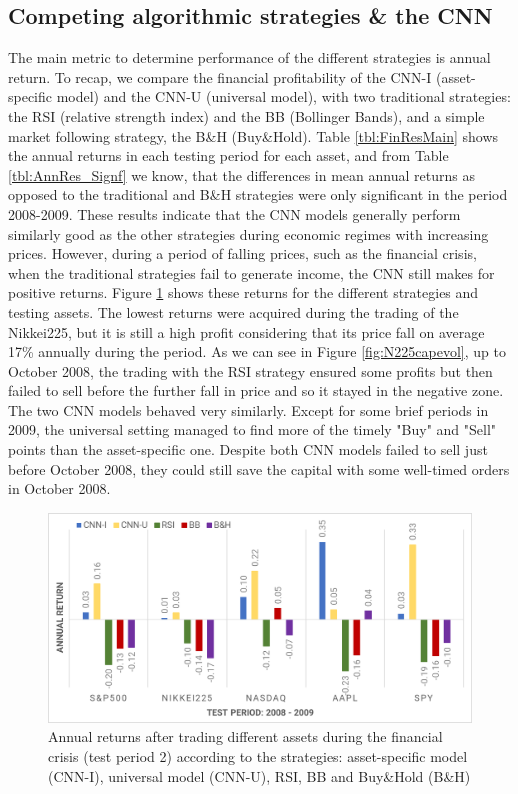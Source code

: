 \documentclass[11pt, a4paper]{article}
\begin{document}
\subsection{Competing algorithmic strategies \& the CNN}

The main metric to determine performance of the different strategies is annual return. 
To recap, we compare the financial profitability of the CNN-I (asset-specific model) and the CNN-U (universal model), with two traditional strategies: the RSI (relative strength index) and the BB (Bollinger Bands), and a simple market following strategy, the B\&H (Buy\&Hold). 
Table \ref{tbl:FinResMain} shows the annual returns in each testing period for each asset, and from Table \ref{tbl:AnnRes_Signf} we know, that the differences in mean annual returns as opposed to the traditional and B\&H strategies were only significant in the period 2008-2009. 
These results indicate that the CNN models generally perform similarly good as the other strategies during economic regimes with increasing prices. However, during a period of falling prices, such as the financial crisis, when the traditional strategies fail to generate income, the CNN still makes for positive returns. 
Figure \ref{fig:CNNvsComp_2} shows these returns for the different strategies and testing assets. The lowest returns were acquired during the trading of the Nikkei225, but it is still a high profit considering that its price fall on average 17\% annually during the period. As we can see in Figure \ref{fig:N225capevol}, up to October 2008, the trading with the RSI strategy ensured some profits but then failed to sell before the further fall in price and so it stayed in the negative zone. The two CNN models behaved very similarly. 
Except for some brief periods in 2009, the universal setting managed to find more of the timely "Buy" and "Sell" points than the asset-specific one. Despite both CNN models failed to sell just before October 2008, they could still save the capital with some well-timed orders in October 2008.
\begin{figure}[ht]
    \centering
    \includegraphics[width=.75\textwidth]{images/CNNvsComp_Crisis.png}
    \caption{Annual returns after trading different assets during the financial crisis (test period 2) according to the strategies: asset-specific model (CNN-I), universal model (CNN-U), RSI, BB and Buy\&Hold (B\&H)}
    \label{fig:CNNvsComp_2}
\end{figure}
\end{document}
